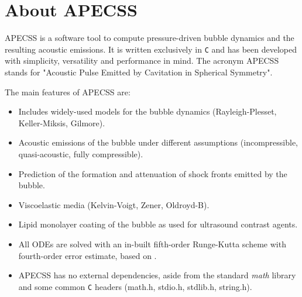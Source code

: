 \chapter{About APECSS}

APECSS is a software tool to compute pressure-driven bubble dynamics and the resulting acoustic emissions. It is written exclusively in {\tt C} and has been developed with simplicity, versatility and performance in mind. The acronym APECSS stands for "Acoustic Pulse Emitted by Cavitation in Spherical Symmetry".

The main features of APECSS are:\vspace{-1em}
\begin{itemize}[noitemsep]
\item Includes widely-used models for the bubble dynamics (Rayleigh-Plesset, Keller-Miksis, Gilmore).
\item Acoustic emissions of the bubble under different assumptions (incompressible, quasi-acoustic, fully compressible).
\item Prediction of the formation and attenuation of shock fronts emitted by the bubble.
\item Viscoelastic media (Kelvin-Voigt, Zener, Oldroyd-B).
\item Lipid monolayer coating of the bubble as used for ultrasound contrast agents.
\item All ODEs are solved with an in-built fifth-order Runge-Kutta scheme with fourth-order error estimate, based on \citet{Dormand1980}.
\item APECSS has no external dependencies, aside from the standard {\it math} library and some common {\tt C} headers (math.h, stdio.h, stdlib.h, string.h).
\end{itemize}

